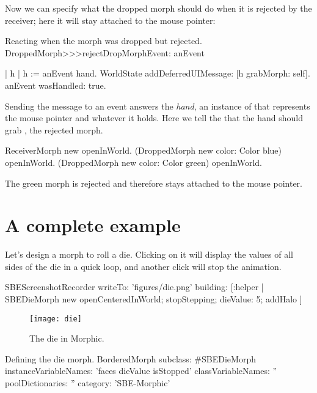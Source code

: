 \documentclass[a4paper,10pt,twoside]{book}
\begin{document}
Now we can specify what the dropped morph should do when it is rejected by the receiver; here it will stay attached to the mouse pointer:
\begin{method}{Reacting when the morph was dropped but rejected.}
DroppedMorph>>>rejectDropMorphEvent: anEvent

	| h |
	h := anEvent hand.
	WorldState addDeferredUIMessage: [h grabMorph: self].
	anEvent wasHandled: true.
\end{method}

Sending the  message to an event answers the \emph{hand}, an instance of  that represents the mouse pointer and whatever it holds.
Here we tell the  that the hand should grab , the rejected morph.

\begin{code}{}
ReceiverMorph new openInWorld.
(DroppedMorph new color: Color blue) openInWorld.
(DroppedMorph new color: Color green) openInWorld.
\end{code}
\noindent
The green morph is rejected and therefore stays attached to the mouse pointer.

\section{A complete example}

Let's design a morph to roll a die.
Clicking on it will display the values of all sides of the die in a quick loop, and another click will stop the animation.

\begin{ExecuteSmalltalkScript}
SBEScreenshotRecorder writeTo: 'figures/die.png' building: [:helper |
	SBEDieMorph new
		openCenteredInWorld;
		stopStepping;
		dieValue: 5;
		addHalo
]
\end{ExecuteSmalltalkScript}
\begin{figure}[ht]
	\centerline{\texttt{[image: die]}}
	\caption{The die in Morphic.
		\label{fig:dialogDie}}
\end{figure}


\begin{classdef}{Defining the die morph.}
BorderedMorph subclass: #SBEDieMorph
	instanceVariableNames: 'faces dieValue isStopped'
	classVariableNames: ''
	poolDictionaries: ''
	category: 'SBE-Morphic'
\end{classdef}
\end{document}

